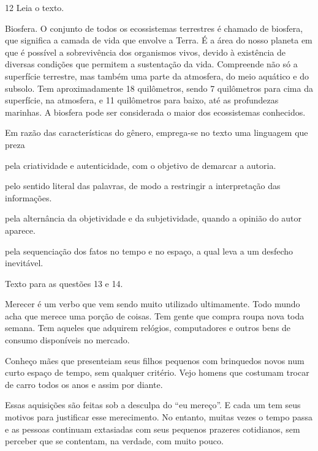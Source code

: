 \num{12} Leia o texto.

\begin{myquote}
Biosfera. O conjunto de todos os ecossistemas terrestres é chamado de
biosfera, que significa a camada de vida que envolve a Terra. É a área
do nosso planeta em que é possível a sobrevivência dos organismos vivos,
devido à existência de diversas condições que permitem a sustentação da
vida. Compreende não só a superfície terrestre, mas também uma parte da
atmosfera, do meio aquático e do subsolo. Tem aproximadamente 18
quilômetros, sendo 7 quilômetros para cima da superfície, na atmosfera,
e 11 quilômetros para baixo, até as profundezas marinhas. A biosfera
pode ser considerada o maior dos ecossistemas conhecidos.

\end{myquote}

Em razão das características do gênero, emprega-se no texto uma linguagem que preza

\begin{escolha}
\item pela criatividade e autenticidade, com o objetivo de demarcar a autoria.

\item pelo sentido literal das palavras, de modo a restringir a interpretação
das informações.

\item pela alternância da objetividade e da subjetividade, quando a opinião do
autor aparece.

\item pela sequenciação dos fatos no tempo e no espaço, a qual leva a um desfecho inevitável.
\end{escolha}

\pagebreak

Texto para as questões 13 e 14.

\begin{myquote}
Merecer é um verbo que vem sendo muito utilizado ultimamente. Todo mundo
acha que merece uma porção de coisas. Tem gente que compra roupa nova
toda semana. Tem aqueles que adquirem relógios, computadores e outros
bens de consumo disponíveis no mercado.

Conheço mães que presenteiam seus filhos pequenos com brinquedos novos
num curto espaço de tempo, sem qualquer critério. Vejo homens que
costumam trocar de carro todos os anos e assim por diante.

Essas aquisições são feitas sob a desculpa do ``eu mereço''. E cada um
tem seus motivos para justificar esse merecimento. No entanto, muitas
vezes o tempo passa e as pessoas continuam extasiadas com seus pequenos
prazeres cotidianos, sem perceber que se contentam, na verdade, com
muito pouco.

\end{myquote}

